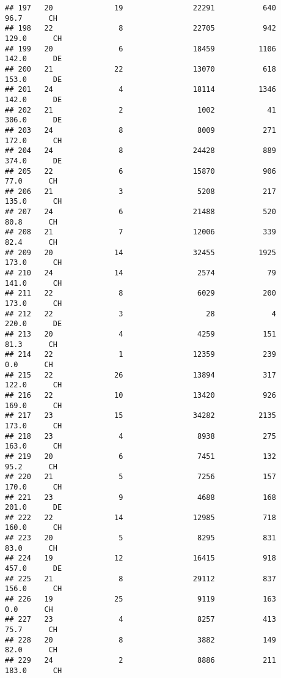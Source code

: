 \documentclass[
]{article}
\begin{document}
\begin{verbatim}
## 197   20              19                22291           640     96.7      CH
## 198   22               8                22705           942    129.0      CH
## 199   20               6                18459          1106    142.0      DE
## 200   21              22                13070           618    153.0      DE
## 201   24               4                18114          1346    142.0      DE
## 202   21               2                 1002            41    306.0      DE
## 203   24               8                 8009           271    172.0      CH
## 204   24               8                24428           889    374.0      DE
## 205   22               6                15870           906     77.0      CH
## 206   21               3                 5208           217    135.0      CH
## 207   24               6                21488           520     80.8      CH
## 208   21               7                12006           339     82.4      CH
## 209   20              14                32455          1925    173.0      CH
## 210   24              14                 2574            79    141.0      CH
## 211   22               8                 6029           200    173.0      CH
## 212   22               3                   28             4    220.0      DE
## 213   20               4                 4259           151     81.3      CH
## 214   22               1                12359           239      0.0      CH
## 215   22              26                13894           317    122.0      CH
## 216   22              10                13420           926    169.0      CH
## 217   23              15                34282          2135    173.0      CH
## 218   23               4                 8938           275    163.0      CH
## 219   20               6                 7451           132     95.2      CH
## 220   21               5                 7256           157    170.0      CH
## 221   23               9                 4688           168    201.0      DE
## 222   22              14                12985           718    160.0      CH
## 223   20               5                 8295           831     83.0      CH
## 224   19              12                16415           918    457.0      DE
## 225   21               8                29112           837    156.0      CH
## 226   19              25                 9119           163      0.0      CH
## 227   23               4                 8257           413     75.7      CH
## 228   20               8                 3882           149     82.0      CH
## 229   24               2                 8886           211    183.0      CH

\end{verbatim}
\end{document}
